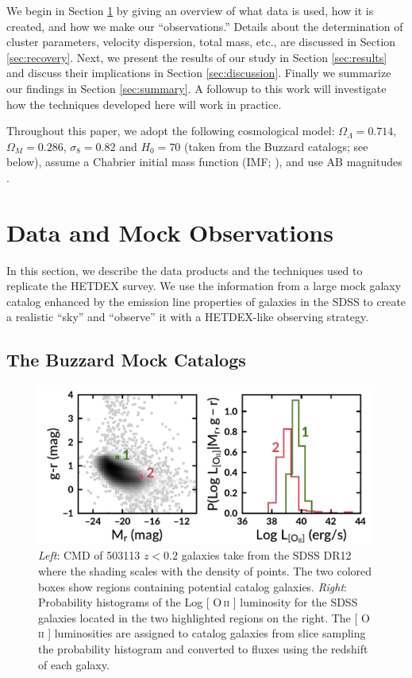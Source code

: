 \documentclass[fleqn,usenatbib]{mnras}
\makeatletter
\DeclareRobustCommand{\ion}[2]{%
\relax\ifmmode
\ifx\testbx\f@series
{\mathbf{#1\,\mathsc{#2}}}\else
{\mathrm{#1\,\mathsc{#2}}}\fi
\else\textup{#1\,{\mdseries\textsc{#2}}}%
\fi}
\makeatother
\begin{document}
We begin in Section \ref{sec:Data} by giving an overview of what data is used, how it is created, and how we make our ``observations.'' Details about the determination of cluster parameters, velocity dispersion, total mass, etc., are discussed in Section \ref{sec:recovery}. Next, we present the results of our study in Section \ref{sec:results} and discuss their implications in Section \ref{sec:discussion}. Finally we summarize our findings in Section \ref{sec:summary}. A followup to this work \citep{Boada2016a} will investigate how the techniques developed here will work in practice. 

Throughout this paper, we adopt the following cosmological model: $\Omega_\Lambda = 0.714$, $\Omega_M = 0.286$, $\sigma_8 = 0.82$ and $H_0= 70$ \kms \mpc (taken from the Buzzard catalogs; see below), assume a Chabrier initial mass function (IMF; \citealt{Chabrier2003}), and use AB magnitudes \citep{Oke1974}.

\section{Data and Mock Observations}\label{sec:Data}
In this section, we describe the data products and the techniques used to replicate the HETDEX survey. We use the information from a large mock galaxy catalog enhanced by the emission line properties of galaxies in the SDSS to create a realistic ``sky'' and ``observe'' it with a HETDEX-like observing strategy.

\subsection{The Buzzard Mock Catalogs}
\begin{figure} 
	\includegraphics[width=\textwidth]{figures/oii_sdss.pdf} 
	\caption{\textit{Left}: CMD of 503113 $z<0.2$ galaxies take from the SDSS DR12 where the shading scales with the density of points. The two colored boxes show regions containing potential catalog galaxies. \textit{Right}: Probability histograms of the Log [\ion{O}{ii}] luminosity for the SDSS galaxies located in the two highlighted regions on the right. The [\ion{O}{ii}] luminosities are assigned to catalog galaxies from slice sampling the probability histogram and converted to fluxes using the redshift of each galaxy.} \label{fig: oii sdss} 
\end{figure}
\end{document}
